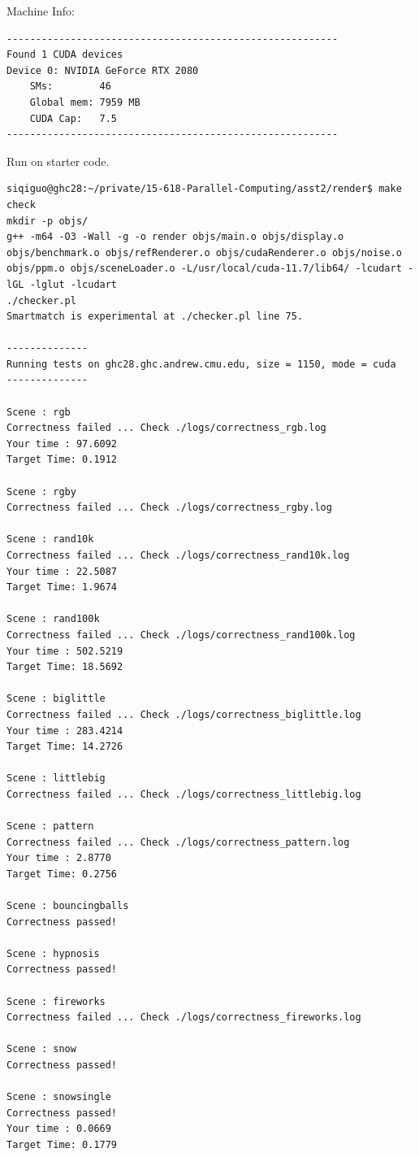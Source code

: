 \documentclass[letterpaper,11pt]{exam}
\begin{document}
\begin{questions}
\begin{enumerate}[label=\roman*.]
              Machine Info:

              \begin{lstlisting}[]
---------------------------------------------------------
Found 1 CUDA devices
Device 0: NVIDIA GeForce RTX 2080
    SMs:        46
    Global mem: 7959 MB
    CUDA Cap:   7.5
---------------------------------------------------------
              \end{lstlisting}
              \newpage
              Run on starter code.
              \begin{lstlisting}[]
siqiguo@ghc28:~/private/15-618-Parallel-Computing/asst2/render$ make check
mkdir -p objs/
g++ -m64 -O3 -Wall -g -o render objs/main.o objs/display.o objs/benchmark.o objs/refRenderer.o objs/cudaRenderer.o objs/noise.o objs/ppm.o objs/sceneLoader.o -L/usr/local/cuda-11.7/lib64/ -lcudart -lGL -lglut -lcudart 
./checker.pl
Smartmatch is experimental at ./checker.pl line 75.

--------------
Running tests on ghc28.ghc.andrew.cmu.edu, size = 1150, mode = cuda
--------------

Scene : rgb
Correctness failed ... Check ./logs/correctness_rgb.log
Your time : 97.6092
Target Time: 0.1912

Scene : rgby
Correctness failed ... Check ./logs/correctness_rgby.log

Scene : rand10k
Correctness failed ... Check ./logs/correctness_rand10k.log
Your time : 22.5087
Target Time: 1.9674

Scene : rand100k
Correctness failed ... Check ./logs/correctness_rand100k.log
Your time : 502.5219
Target Time: 18.5692

Scene : biglittle
Correctness failed ... Check ./logs/correctness_biglittle.log
Your time : 283.4214
Target Time: 14.2726

Scene : littlebig
Correctness failed ... Check ./logs/correctness_littlebig.log

Scene : pattern
Correctness failed ... Check ./logs/correctness_pattern.log
Your time : 2.8770
Target Time: 0.2756

Scene : bouncingballs
Correctness passed!

Scene : hypnosis
Correctness passed!

Scene : fireworks
Correctness failed ... Check ./logs/correctness_fireworks.log

Scene : snow
Correctness passed!

Scene : snowsingle
Correctness passed!
Your time : 0.0669
Target Time: 0.1779


\end{lstlisting}
\end{enumerate}
\end{questions}
\end{document}
